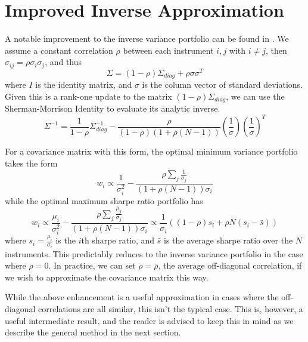 \documentclass[10pt,twoside,titlepage]{article}   %
\begin{document}
\section{Improved Inverse Approximation}\label{sec-approx}
A notable improvement to the inverse variance portfolio can be found in \cite{LopezAndLewis}. 
We assume a constant correlation $\rho$ between each instrument $i, j$ with $i \neq j$, then $\sigma_{ij}=\rho \sigma_i \sigma_j$, and thus
\begin{equation*}
\Sigma = (1 - \rho) \Sigma_{diag} + \rho \sigma \sigma^T
\end{equation*}
where $I$ is the identity matrix, and $\sigma$ is the column vector of standard deviations. 
Given this is a rank-one update to the matrix $(1 - \rho) \Sigma_{diag}$, we can use the Sherman-Morrison Identity to evaluate its analytic inverse.
\begin{equation*}
\Sigma^{-1} = \frac{1}{1 - \rho} \Sigma_{diag}^{-1} - \frac{ \rho }{ (1-\rho) (1 + \rho (N-1) ) } \left( \frac{1}{\sigma} \right) \left( \frac{1}{\sigma} \right)^T
\end{equation*}

For a covariance matrix with this form, the optimal minimum variance portfolio takes the form
\begin{equation*}
w_i \propto \frac{1}{\sigma_i^2} - \frac{ \rho \sum_j \frac{1}{\sigma_j} }{ ( 1 + \rho (N-1) )\sigma_i  }
\end{equation*}
while the optimal maximum sharpe ratio portfolio has
\begin{equation*}
w_i \propto \frac{\mu_i}{\sigma_i^2} - \frac{ \rho \sum_j \frac{\mu_j}{\sigma_j} }{ ( 1 + \rho (N-1) )\sigma_i  } \propto \frac{1}{\sigma_i} \left( (1-\rho) s_i + \rho N ( s_i - \bar{s} ) \right)
\end{equation*}
where $s_i = \frac{\mu_i}{\sigma_i}$ is the $i$th sharpe ratio, and $\bar{s}$ is the average sharpe ratio over the $N$ instruments. 
This predictably reduces to the inverse variance portfolio in the case where $\rho=0$. 
In practice, we can set $\rho = \bar{\rho}$, the average off-diagonal correlation, if we wish to approximate the covariance matrix this way.

While the above enhancement is a useful approximation in cases where the off-diagonal correlations are all similar, this isn’t the typical case.
This is, however, a useful intermediate result, and the reader is advised to keep this in mind as we describe the general method in the next section.
\end{document}
